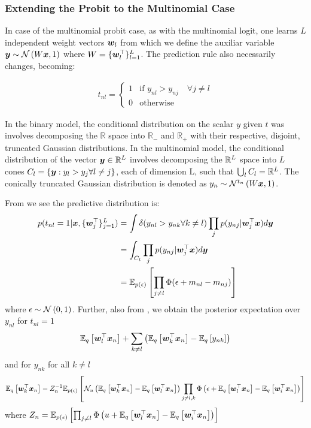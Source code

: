 

\subsubsection{Extending the Probit to the Multinomial Case}
In case of the multinomial probit case, as with the multinomial logit, one learns $L$ independent weight vectors $\vv{w}_l$ from which we define the auxiliar variable $\vv{y} \sim \nor{W\vv{x}}{1}$ where $W = \{ \vv{w}_l\T \}_{l=1}^L$. The prediction rule also necessarily changes, becoming:

\begin{align}
t_{nl} = \left\{ \begin{array}{lr} 1 & \text{if } y_{nl} > y_{nj} \quad \forall j \neq l \\ 0 & \text{otherwise} \end{array} \right.
\end{align}

In the binary model, the conditional distribution on the scalar $y$ given $t$ was involves decomposing the $\mathbb{R}$ space into $\mathbb{R}_-$ and $\mathbb{R}_+$ with their respective, disjoint, truncated Gaussian distributions. In the multinomial model, the conditional distribution of the vector $\vv{y} \in \VReal{L}$ involves decomposing the $\VReal{L}$ space into $L$ cones $C_l = \{ \vv{y} : y_l > y_j \forall l \neq j \}$, each of dimension L, such that $\bigcup_l C_l = \VReal{L}$. The conically truncated Gaussian distribution is denoted as $y_n \sim \mathcal{N}^{t_n}\left(W\vv{x}, 1\right)$. 

From \cite{Girolami2007} we see the predictive distribution is:
\begin{align}
p(t_{nl} = 1 | \vv{x}, \{ \vv{w}_j\T \}_{j=1}^L) & =
\int \delta (y_{nl} > y_{nk} \forall k \neq l) \prod_j p(y_{nj} | \vv{w}_j\T\vv{x}) d\vv{y} \\
&= \int_{C_l} \prod_j p(y_{nj} | \vv{w}_j\T\vv{x}) d\vv{y} \\
&= \ex{\prod_{j \neq l} \Phi(\epsilon + m_{nl} - m_{nj})}{p(\epsilon)}
\end{align}
where $\epsilon \sim \nor{0}{1}$. Further, also from \cite{Girolami2007}, we obtain the posterior expectation over $y_{nl}$ for $t_{nl} = 1$
\begin{align}
\ex{\vv{w}_l\T\vv{x}_n}{q} + \sum_{k \neq l} \left(\ex{\vv{w}_k\T\vv{x}_n}{q} - \ex{y_{nk}}{q}\right)
\end{align}
and for $y_{nk}$ for all $k \neq l$
\begin{align}
\ex{\vv{w}_k\T\vv{x}_n}{q} - Z_n^{-1}\ex{\mathcal{N}_u\left(\ex{\vv{w}_k\T\vv{x}_n}{q} - \ex{\vv{w}_l\T\vv{x}_n}{q} \right) \prod_{j \neq l,k}\Phi\left(\epsilon + \ex{\vv{w}_l\T\vv{x}_n}{q} - \ex{\vv{w}_i\T\vv{x}_n}{q} \right) }{p(\epsilon)} 
\end{align}
where $Z_n = \ex{\prod_{j \neq l}\Phi\left(u + \ex{\vv{w}_l\T\vv{x}_n}{q} - \ex{\vv{w}_i\T\vv{x}_n}{q} \right) }{p(\epsilon)}$

